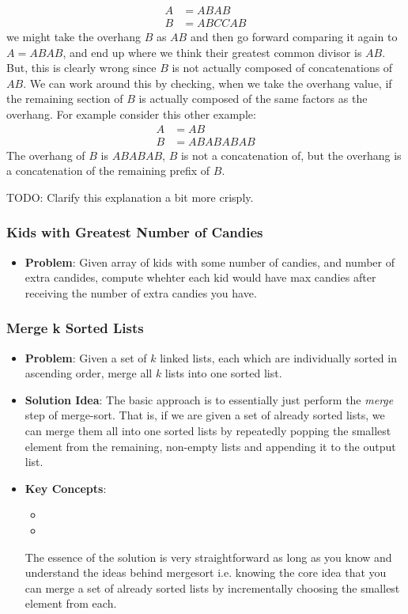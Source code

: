 \documentclass[10pt,a4paper]{article}
\begin{document}
\begin{itemize}
    \begin{align*}
        A &= ABAB \\
        B &= ABCCAB
    \end{align*}
    we might take the overhang $B$ as $AB$ and then go forward comparing it again to $A=ABAB$, and end up where we think their greatest common divisor is $AB$. But, this is clearly wrong since $B$ is not actually composed of concatenations of $AB$. We can work around this by checking, when we take the overhang value, if the remaining section of $B$ is actually composed of the same factors as the overhang. For example consider this other example:
    \begin{align*}
        A &= AB \\
        B &= ABABABAB
    \end{align*}
    The overhang of $B$ is $ABABAB$, $B$ is not a concatenation of, but the overhang is a concatenation of the remaining prefix of $B$.

    TODO: Clarify this explanation a bit more crisply.
\end{itemize}

\subsubsection*{Kids with Greatest Number of Candies}
\begin{itemize}
    \item \textbf{Problem}: Given array of kids with some number of candies, and number of extra candides, compute whehter each kid would have max candies after receiving the number of extra candies you have.
\end{itemize}

\subsubsection*{Merge k Sorted Lists}

\begin{itemize}
    \item \textbf{Problem}: Given a set of $k$ linked lists, each which are individually sorted in ascending order, merge all $k$ lists into one sorted list. 
    \item \textbf{Solution Idea}: The basic approach is to essentially just perform the \textit{merge} step of merge-sort. That is, if we are given a set of already sorted lists, we can merge them all into one sorted lists by repeatedly popping the smallest element from the remaining, non-empty lists and appending it to the output list.
    \item \textbf{Key Concepts}: 
    \begin{itemize}
        \item {}
        \item {}
    \end{itemize}
    The essence of the solution is very straightforward as long as you know and understand the ideas behind mergesort i.e. knowing the core idea that you can merge a set of already sorted lists by incrementally choosing the smallest element from each.
\end{itemize}
\end{document}
